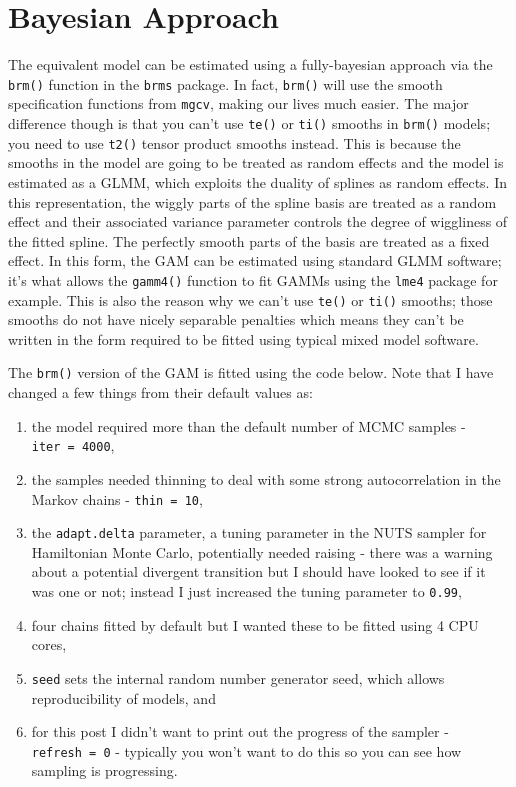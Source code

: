 \documentclass[]{book}
\begin{document}
\hypertarget{bayesian-approach}{%
\section{Bayesian Approach}\label{bayesian-approach}}

The equivalent model can be estimated using a fully-bayesian approach via the \texttt{brm()} function in the \texttt{brms} package. In fact, \texttt{brm()} will use the smooth specification functions from \texttt{mgcv}, making our lives much easier. The major difference though is that you can't use \texttt{te()} or \texttt{ti()} smooths in \texttt{brm()} models; you need to use \texttt{t2()} tensor product smooths instead. This is because the smooths in the model are going to be treated as random effects and the model is estimated as a GLMM, which exploits the duality of splines as random effects. In this representation, the wiggly parts of the spline basis are treated as a random effect and their associated variance parameter controls the degree of wiggliness of the fitted spline. The perfectly smooth parts of the basis are treated as a fixed effect. In this form, the GAM can be estimated using standard GLMM software; it's what allows the \texttt{gamm4()} function to fit GAMMs using the \texttt{lme4} package for example. This is also the reason why we can't use \texttt{te()} or \texttt{ti()} smooths; those smooths do not have nicely separable penalties which means they can't be written in the form required to be fitted using typical mixed model software.

The \texttt{brm()} version of the GAM is fitted using the code below. Note that I have changed a few things from their default values as:

\begin{enumerate}
\def\labelenumi{\arabic{enumi}.}
\item
  the model required more than the default number of MCMC samples - \texttt{iter\ =\ 4000},
\item
  the samples needed thinning to deal with some strong autocorrelation in the Markov chains - \texttt{thin\ =\ 10},
\item
  the \texttt{adapt.delta} parameter, a tuning parameter in the NUTS sampler for Hamiltonian Monte Carlo, potentially needed raising - there was a warning about a potential divergent transition but I should have looked to see if it was one or not; instead I just increased the tuning parameter to \texttt{0.99},
\item
  four chains fitted by default but I wanted these to be fitted using 4 CPU cores,
\item
  \texttt{seed} sets the internal random number generator seed, which allows reproducibility of models, and
\item
  for this post I didn't want to print out the progress of the sampler - \texttt{refresh\ =\ 0} - typically you won't want to do this so you can see how sampling is progressing.
\end{enumerate}
\end{document}
